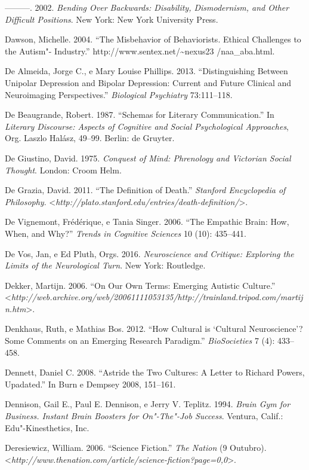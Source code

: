 ---------. 2002. \emph{Bending Over Backwards: Disability, Dismodernism,
and Other Difficult Positions}. New York: New York University Press.

Dawson, Michelle. 2004. ``The Misbehavior of Behaviorists. Ethical
Challenges to the Autism"- Industry.''
http://www.sentex.net/\textasciitilde{}nexus23 /naa\_aba.html.

De Almeida, Jorge C., e Mary Louise Phillips. 2013. ``Distinguishing
Between Unipolar Depression and Bipolar Depression: Current and Future
Clinical and Neuroimaging Perspectives.'' \emph{Biological Psychiatry}
73:111--118.

De Beaugrande, Robert. 1987. ``Schemas for Literary Communication.'' In
\emph{Literary Discourse: Aspects of Cognitive and Social Psychological
Approaches}, Org. Laszlo Halász, 49--99. Berlin: de Gruyter.

De Giustino, David. 1975. \emph{Conquest of Mind: Phrenology and
Victorian Social Thought}. London: Croom Helm.

De Grazia, David. 2011. ``The Definition of Death.'' \emph{Stanford
Encyclopedia of Philosophy}.
\textless{}\emph{http://plato.stanford.edu/entries/death-definition/}\textgreater{}.

De Vignemont, Frédérique, e Tania Singer. 2006. ``The Empathic Brain:
How, When, and Why?'' \emph{Trends in Cognitive Sciences} 10 (10):
435--441.

De Vos, Jan, e Ed Pluth, Orgs. 2016. \emph{Neuroscience and Critique:
Exploring the Limits of the Neurological Turn}. New York: Routledge.

Dekker, Martijn. 2006. ``On Our Own Terms: Emerging Autistic Culture.''
\textless{}\emph{http://web.archive.org/web/20061111053135/http://trainland.tripod.com/martijn.htm}\textgreater{}.

Denkhaus, Ruth, e Mathias Bos. 2012. ``How Cultural is `Cultural
Neuroscience'? Some Comments on an Emerging Research Paradigm.''
\emph{BioSocieties} 7 (4): 433--458.

Dennett, Daniel C. 2008. ``Astride the Two Cultures: A Letter to Richard
Powers, Upadated.'' In Burn e Dempsey 2008, 151--161.

Dennison, Gail E., Paul E. Dennison, e Jerry V. Teplitz. 1994.
\emph{Brain Gym for Business. Instant Brain Boosters for On"-The"-Job
Success}. Ventura, Calif.: Edu"-Kinesthetics, Inc.

Deresiewicz, William. 2006. ``Science Fiction.'' \emph{The Nation} (9
Outubro).
\textless{}\emph{http://www.thenation.com/article/science-fiction?page=0,0}\textgreater{}.

